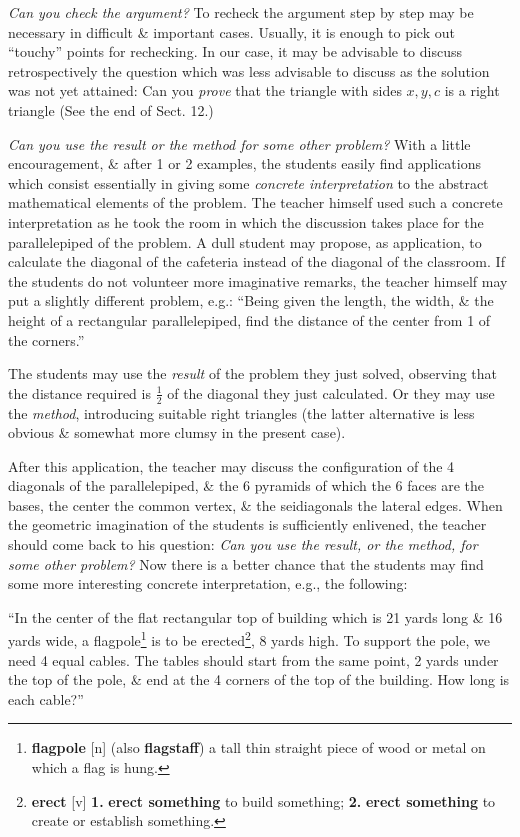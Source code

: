 \documentclass[oneside]{book}
\numberwithin{equation}{section}
\begin{document}
\textit{Can you check the argument?} To recheck the argument step by step may be necessary in difficult \& important cases. Usually, it is enough to pick out ``touchy'' points for rechecking. In our case, it may be advisable to discuss retrospectively the question which was less advisable to discuss as the solution was not yet attained: Can you \textit{prove} that the triangle with sides $x,y,c$ is a right triangle (See the end of Sect. 12.)

\textit{Can you use the result or the method for some other problem?} With a little encouragement, \& after 1 or 2 examples, the students easily find applications which consist essentially in giving some \textit{concrete interpretation} to the abstract mathematical elements of the problem. The teacher himself used such a concrete interpretation as he took the room in which the discussion takes place for the parallelepiped of the problem. A dull student may propose, as application, to calculate the diagonal of the cafeteria instead of the diagonal of the classroom. If the students do not volunteer more imaginative remarks, the teacher himself may put a slightly different problem, e.g.: ``Being given the length, the width, \& the height of a rectangular parallelepiped, find the distance of the center from 1 of the corners.''

The students may use the \textit{result} of the problem they just solved, observing that the distance required is $\frac{1}{2}$ of the diagonal they just calculated. Or they may use the \textit{method}, introducing suitable right triangles (the latter alternative is less obvious \& somewhat more clumsy in the present case).

After this application, the teacher may discuss the configuration of the 4 diagonals of the parallelepiped, \& the 6 pyramids of which the 6 faces are the bases, the center the common vertex, \& the seidiagonals the lateral edges. When the geometric imagination of the students is sufficiently enlivened, the teacher should come back to his question: \textit{Can you use the result, or the method, for some other problem?} Now there is a better chance that the students may find some more interesting concrete interpretation, e.g., the following:

``In the center of the flat rectangular top of  building which is 21 yards long \& 16 yards wide, a flagpole\footnote{\textbf{flagpole} [n] (also \textbf{flagstaff}) a tall thin straight piece of wood or metal on which a flag is hung.} is to be erected\footnote{\textbf{erect} [v] \textbf{1.} \textbf{erect something} to build something; \textbf{2.} \textbf{erect something} to create or establish something.}, 8 yards high. To support the pole, we need 4 equal cables. The tables should start from the same point, 2 yards under the top of the pole, \& end at the 4 corners of the top of the building. How long is each cable?''
\end{document}
